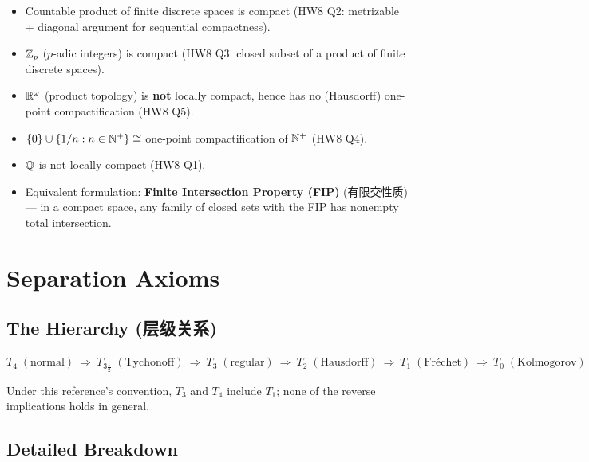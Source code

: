 \documentclass{article}
\begin{document}
\begin{itemize}
  \item Countable product of finite discrete spaces is compact
  (HW8 Q2: metrizable + diagonal argument for sequential compactness).

  \item $\mathbb{Z}_p$ ($p$-adic integers) is compact (HW8 Q3: closed subset of a product
  of finite discrete spaces).

  \item $\mathbb{R}^\omega$ (product topology) is \textbf{not} locally compact,
  hence has no (Hausdorff) one-point compactification (HW8 Q5).

  \item $\{0\}\cup\{1/n:n\in\mathbb{N}^+\}\cong$ one-point compactification of $\mathbb{N}^+$ (HW8 Q4).

  \item $\mathbb{Q}$ is not locally compact (HW8 Q1).

  \item Equivalent formulation: \textbf{Finite Intersection Property (FIP)} (有限交性质)
  --- in a compact space, any family of closed sets with the FIP has nonempty total intersection.
\end{itemize}

\section{Separation Axioms}

\subsection{The Hierarchy (层级关系)}

\begin{center}
  $
  T_4\;(\text{normal})\ \Longrightarrow\ T_{3\frac12}\;(\text{Tychonoff})\ \Longrightarrow\
  T_3\;(\text{regular})\ \Longrightarrow\ T_2\;(\text{Hausdorff})\ \Longrightarrow\
  T_1\;(\text{Fr\'echet})\ \Longrightarrow\ T_0\;(\text{Kolmogorov})
  $
\end{center}

Under this reference's convention, $T_3$ and $T_4$ include $T_1$;
none of the reverse implications holds in general.

\subsection{Detailed Breakdown}
\end{document}
